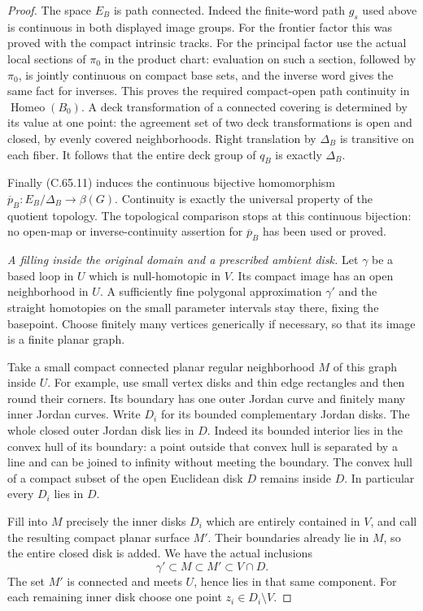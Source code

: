 \begin{proof}
The space $E_B$ is path connected. Indeed
the finite-word path $g_s$ used above is
continuous in both displayed image groups.
For the frontier factor this was proved
with the compact intrinsic tracks. For
the principal factor use the actual local
sections of $\pi_0$ in the product chart:
evaluation on such a section, followed
by $\pi_0$, is jointly continuous on
compact base sets, and the inverse word
gives the same fact for inverses.
This proves the required compact-open
path continuity in $\operatorname{Homeo}(B_0)$.
A deck transformation of a connected
covering is determined by its value at
one point: the agreement set of two
deck transformations is open and closed,
by evenly covered neighborhoods. Right
translation by $\Delta_B$ is transitive
on each fiber. It follows that the
entire deck group of $q_B$ is exactly
$\Delta_B$.

Finally (C.65.11) induces the continuous
bijective homomorphism
$\overline p_B:E_B/\Delta_B\to\beta(G)$.
Continuity is exactly the universal
property of the quotient topology.
The topological comparison stops at
this continuous bijection: no open-map
or inverse-continuity assertion for
$\overline p_B$ has been used or proved.

\emph{A filling inside the original domain and a prescribed
ambient disk.}
Let $\gamma$ be a based loop in $U$
which is null-homotopic in $V$.
Its compact image has an open
neighborhood in $U$. A sufficiently
fine polygonal approximation $\gamma'$
and the straight homotopies on the
small parameter intervals stay there,
fixing the basepoint. Choose finitely
many vertices generically if necessary,
so that its image is a finite planar
graph.

Take a small compact connected planar
regular neighborhood $M$ of this graph
inside $U$. For example, use small
vertex disks and thin edge rectangles
and then round their corners. Its
boundary has one outer Jordan curve
and finitely many inner Jordan curves.
Write $D_i$ for its bounded
complementary Jordan disks.
The whole closed outer Jordan disk
lies in $D$. Indeed its bounded
interior lies in the convex hull of
its boundary: a point outside that
convex hull is separated by a line
and can be joined to infinity without
meeting the boundary. The convex
hull of a compact subset of the
open Euclidean disk $D$ remains
inside $D$. In particular every
$D_i$ lies in $D$.

Fill into $M$ precisely the inner
disks $D_i$ which are entirely
contained in $V$, and call the
resulting compact planar surface $M'$.
Their boundaries already lie in $M$,
so the entire closed disk is added.
We have the actual inclusions
\[
              \gamma'\subset M\subset M'\subset V\cap D.
                                                               \tag{C.65.7}
\]
The set $M'$ is connected and meets
$U$, hence lies in that same component.
For each remaining inner disk choose
one point $z_i\in D_i\setminus V$.


\end{proof}
